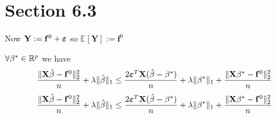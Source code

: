 \section{Section 6.3}

Now $\mathbf{Y} :=\mathbf{f}^{0} + \boldsymbol{\varepsilon}$ so $\mathbb{E} [\mathbf{Y}] :=\mathbf{f}^{0}$


\begin{lemma}
    $\forall \beta^* \in \mathbb{R}^p$ we have
    \begin{equation}
        \frac{\|\mathbf{X} \hat \beta - \mathbf{f}^0 \|_{2}^{2}}{n} + \lambda\| \hat \beta \|_{1} \leq \frac{2 \boldsymbol{\varepsilon}^T \mathbf{X} (\hat\beta - \beta^*)}{n} + \lambda \| \beta^*\|_{1} + \frac{\|\mathbf{X} \beta^* - \mathbf{f}^0\|_{2}^{2}}{n}
    \end{equation}
    $$    \frac{\|\mathbf{X} \hat \beta - \mathbf{f}^0 \|_{2}^{2}}{n} + \lambda\| \hat \beta \|_{1} \leq  \frac{2 \boldsymbol{\varepsilon}^T \mathbf{X} (\hat\beta - \beta^*)}{n} + \lambda \| \beta^*\|_{1} + \frac{\|\mathbf{X} \beta^* - \mathbf{f}^0\|_{2}^{2}}{n}$$
\end{lemma}
